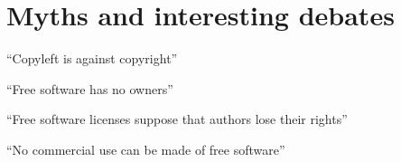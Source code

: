 

\section{Myths and interesting debates}



\begin{frame}

\begin{center}
\huge{``Copyleft is against copyright''}
\end{center}

\end{frame}



\begin{frame}

\begin{center}
\huge{``Free software has no owners''}
\end{center}

\end{frame}


\begin{frame}

\begin{center}
\huge{``Free software licenses suppose that authors lose their rights''}
\end{center}

\end{frame}



\begin{frame}

\begin{center}
\huge{``No commercial use can be made of free software''}
\end{center}

\end{frame}


